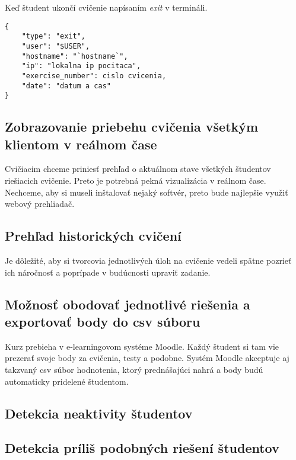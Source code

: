 Keď študent ukončí cvičenie napísaním \textit{exit} v termináli.

\begin{lstlisting}
{
    "type": "exit",
    "user": "$USER",
    "hostname": "`hostname`",
    "ip": "lokalna ip pocitaca",
    "exercise_number": cislo cvicenia,
    "date": "datum a cas"
}
\end{lstlisting}

\subsection{Zobrazovanie priebehu cvičenia všetkým klientom v reálnom čase}
\label{sec:apprequirements:visualization}

Cvičiacim chceme priniesť prehľad o aktuálnom stave všetkých študentov riešiacich
cvičenie. Preto je potrebná pekná vizualizácia v reálnom čase. Nechceme, aby si museli
inštalovať nejaký softvér, preto bude najlepšie využiť webový prehliadač.

\subsection{Prehľad historických cvičení}
\label{sec:apprequirements:overview}

Je dôležité, aby si tvorcovia jednotlivých úloh na cvičenie vedeli spätne pozrieť
ich náročnosť a poprípade v budúcnosti upraviť zadanie.

\subsection{Možnosť obodovať jednotlivé riešenia a exportovať body do csv súboru}
\label{sec:apprequirements:export}

Kurz prebieha v e-learningovom systéme Moodle. Každý študent si tam vie prezerať
svoje body za cvičenia, testy a podobne. Systém Moodle akceptuje aj takzvaný
csv súbor hodnotenia, ktorý prednášajúci nahrá a body budú automaticky pridelené
študentom.

\subsection{Detekcia neaktivity študentov}
\label{sec:apprequirements:noactivity}

\subsection{Detekcia príliš podobných riešení študentov}
\label{sec:apprequirements:similarsolutions}